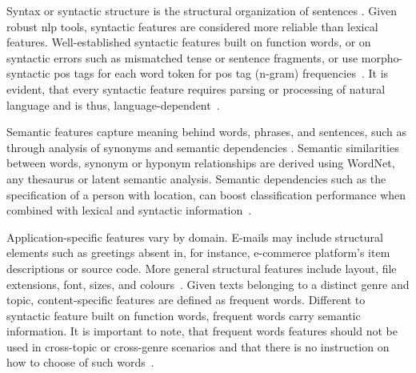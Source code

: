 \begin{table}[]
\centering
\caption{Comparison of a subset of lexical features~\citep{stamatatos_survey_2009}. Requirements refer to computational requirements such as a tokenizer.}
\label{tab:comp_lexical}
\end{table}

Syntax or syntactic structure is the structural organization of sentences \citep{kurt_pehlivanoglu_comparative_2024}.
Given robust \ac{nlp} tools, syntactic features are considered more reliable than lexical features.
Well-established syntactic features built on function words, or on syntactic errors such as mismatched tense or sentence fragments, or use morpho-syntactic \ac{pos} tags for each word token for \ac{pos} tag (n-gram) frequencies~\citep{abbasi_writeprints_2008,stamatatos_survey_2009}.
It is evident, that every syntactic feature requires parsing or processing of natural language and is thus, language-dependent~\citep{neal_surveying_2018,stamatatos_survey_2009}.

Semantic features capture meaning behind words, phrases, and sentences, such as through analysis of synonyms and semantic dependencies \citep{neal_surveying_2018}.
Semantic similarities between words, synonym or hyponym relationships are derived using WordNet, any thesaurus or latent semantic analysis.
Semantic dependencies such as the specification of a person with location, can boost classification performance when combined with lexical and syntactic information~\cite{stamatatos_survey_2009}.


Application-specific features vary by domain.
E-mails may include structural elements such as greetings absent in, for instance, e-commerce platform's item descriptions or source code.
More general structural features include layout, file extensions, font, sizes, and colours~\citep{abbasi_writeprints_2008,neal_surveying_2018}.
Given texts belonging to a distinct genre and topic, content-specific features are defined as frequent words.
Different to syntactic feature built on function words, frequent words carry semantic information.
It is important to note, that frequent words features should not be used in cross-topic or cross-genre scenarios and that there is no instruction on how to choose of such words~\citep{abbasi_writeprints_2008}.

